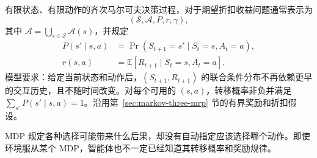 \documentclass[UTF8]{ctexart}
\begin{document}
\begin{definition}[马尔可夫决策过程]
有限状态、有限动作的齐次马尔可夫决策过程，对于期望折扣收益问题通常表示为
\[
  (\mathcal S,\mathcal A,P,r,\gamma),
\]
其中 $\mathcal A=\bigcup_{s\in\mathcal S}\mathcal A(s)$，并规定
\begin{equation}
  \begin{aligned}
    P(s'\mid s,a)&=\Pr(S_{t+1}=s'\mid S_t=s,A_t=a),\\
    r(s,a)&=\mathbb E[R_{t+1}\mid S_t=s,A_t=a].
  \end{aligned}
  \label{eq:markov-three-mdp-model}
\end{equation}
模型要求：给定当前状态和动作后，$(S_{t+1},R_{t+1})$ 的联合条件分布不再依赖更早的交互历史，且不随时间改变。对每个可用的 $(s,a)$，转移概率非负并满足 $\sum_{s'}P(s'\mid s,a)=1$。沿用第~\ref{sec:markov-three-mrp} 节的有界奖励和折扣假设。
\end{definition}

MDP 规定各种选择可能带来什么后果，却没有自动指定应该选择哪个动作。即使环境服从某个 MDP，智能体也不一定已经知道其转移概率和奖励规律。
\end{document}

